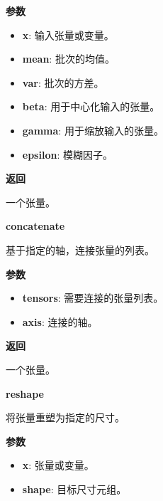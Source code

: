 \textbf{参数}

\begin{itemize}
\tightlist
\item
  \textbf{x}: 输入张量或变量。
\item
  \textbf{mean}: 批次的均值。
\item
  \textbf{var}: 批次的方差。
\item
  \textbf{beta}: 用于中心化输入的张量。
\item
  \textbf{gamma}: 用于缩放输入的张量。
\item
  \textbf{epsilon}: 模糊因子。
\end{itemize}

\textbf{返回}

一个张量。


\textbf{concatenate}\label{concatenate}

\begin{Shaded}
\begin{Highlighting}[]
\OperatorTok{=-}\NormalTok{)}
\end{Highlighting}
\end{Shaded}

基于指定的轴，连接张量的列表。

\textbf{参数}

\begin{itemize}
\tightlist
\item
  \textbf{tensors}: 需要连接的张量列表。
\item
  \textbf{axis}: 连接的轴。
\end{itemize}

\textbf{返回}

一个张量。


\textbf{reshape}\label{reshape}

\begin{Shaded}
\begin{Highlighting}[]
\end{Highlighting}
\end{Shaded}

将张量重塑为指定的尺寸。

\textbf{参数}

\begin{itemize}
\tightlist
\item
  \textbf{x}: 张量或变量。
\item
  \textbf{shape}: 目标尺寸元组。
\end{itemize}


